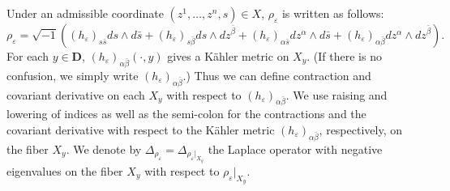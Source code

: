 \documentclass{amsart}
\theoremstyle{definition}
\numberwithin{equation}{section}
\begin{document}
Under an admissible coordinate $(z^1,\dots,z^n,s)\in X$, $\rho_{\varepsilon}$ is written as follows:
\begin{equation*}
\rho_{\varepsilon}
=
{\sqrt{-1}}{\left({(h_{\varepsilon})_{s\bar s}ds\wedge d\bar s
+(h_{\varepsilon})_{s\bar\beta}ds\wedge{dz}^{\bar\beta} 
+(h_{\varepsilon})_{\alpha\bar s}dz^\alpha\wedge d\bar s
+(h_{\varepsilon})_{\alpha\bar\beta}dz^\alpha\wedge{dz}^{\bar\beta}
}\right)}.
\end{equation*}
For each $y\in{\mathbf{D}}$, $(h_{\varepsilon})_{\alpha\bar\beta}(\cdot,y)$ gives a K\"{a}hler metric on $X_y$. (If there is no confusion, we simply write $(h_{\varepsilon})_{\alpha\bar\beta}$.) Thus we can define contraction and covariant derivative on each $X_y$ with respect to $(h_{\varepsilon})_{\alpha\bar\beta}$. We use raising and lowering of indices as well as the semi-colon for the contractions and the covariant derivative with respect to the K\"{a}hler metric $(h_{\varepsilon})_{\alpha\bar\beta}$, respectively, on the fiber $X_y$.  We denote by $\Delta_{\rho_{\varepsilon}}=\Delta_{\rho_{\varepsilon}\vert_{X_y}}$ the Laplace operator with negative eigenvalues on the fiber $X_y$ with respect to $\rho_{\varepsilon}\vert_{X_y}$. 
\end{document}
